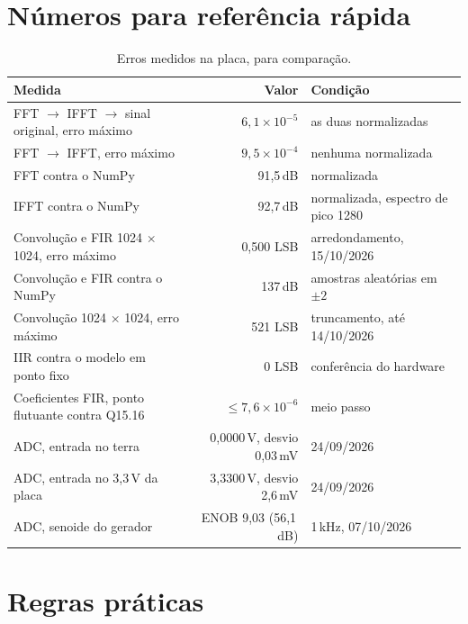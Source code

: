 \section{Números para referência rápida}

\begin{table}[htbp]
  \centering
  \small
  \caption{Erros medidos na placa, para comparação.}
  \label{tab:erros}
  \begin{tabularx}{\textwidth}{@{}Xrl@{}}
    \toprule
    \textbf{Medida} & \textbf{Valor} & \textbf{Condição} \\
    \midrule
    FFT \(\to\) IFFT \(\to\) sinal original, erro máximo & \(6{,}1\times10^{-5}\)
      & as duas normalizadas \\
    FFT \(\to\) IFFT, erro máximo & \(9{,}5\times10^{-4}\) & nenhuma normalizada \\
    FFT contra o NumPy & 91,5\,dB & normalizada \\
    IFFT contra o NumPy & 92,7\,dB & normalizada, espectro de pico 1280 \\
    Convolução e FIR 1024 \(\times\) 1024, erro máximo & 0,500 LSB
      & arredondamento, 15/10/2026 \\
    Convolução e FIR contra o NumPy & 137\,dB & amostras aleatórias em \(\pm 2\) \\
    Convolução 1024 \(\times\) 1024, erro máximo & 521 LSB
      & truncamento, até 14/10/2026 \\
    IIR contra o modelo em ponto fixo & 0 LSB & conferência do hardware \\
    Coeficientes FIR, ponto flutuante contra Q15.16 & \(\le 7{,}6\times10^{-6}\)
      & meio passo \\
    ADC, entrada no terra & 0,0000\,V, desvio 0,03\,mV & 24/09/2026 \\
    ADC, entrada no 3,3\,V da placa & 3,3300\,V, desvio 2,6\,mV & 24/09/2026 \\
    ADC, senoide do gerador & ENOB 9,03 (56,1\,dB) & 1\,kHz, 07/10/2026 \\
    \bottomrule
  \end{tabularx}
\end{table}

\section{Regras práticas}


